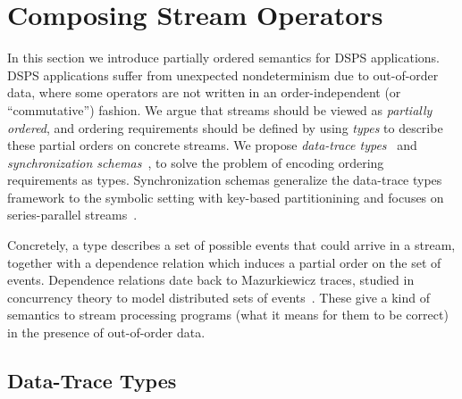 \section{Composing Stream Operators}
\label{sec:semantics}




In this section we introduce partially ordered semantics for DSPS applications.
DSPS applications suffer from unexpected nondeterminism due to out-of-order data, where some operators are not written in an order-independent (or ``commutative'') fashion.
We argue that streams should be viewed as \emph{partially ordered},
and ordering requirements should be defined by using
\emph{types} to describe these partial orders on concrete streams.
We propose
\emph{data-trace types}~
and \emph{synchronization schemas}~,
to solve the problem of encoding ordering requirements as types.
Synchronization schemas generalize the data-trace types framework to
the symbolic setting with key-based partitionining and focuses on series-parallel streams~.

Concretely, a type describes a set of possible events that could arrive in a stream, together with a dependence relation which induces a partial order on the set of events.
Dependence relations date back to Mazurkiewicz traces, studied in concurrency theory to model distributed sets of events~\cite{mazurkiewicz1986trace,DiekertR1995}.
These give a kind of semantics to stream processing programs (what it means for
them to be correct) in the presence of out-of-order data.

\subsection{Data-Trace Types}
\label{subsec:dtt-1}

